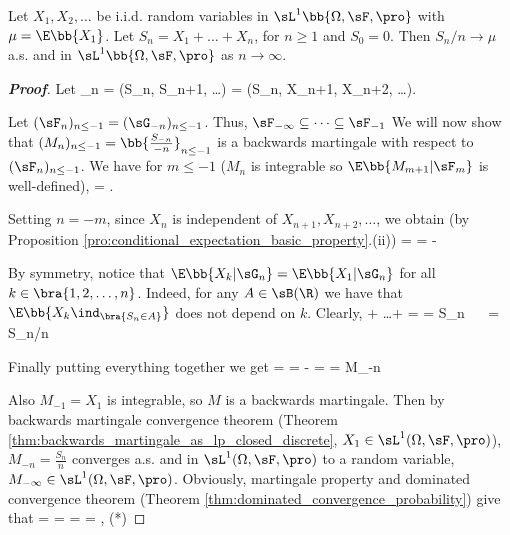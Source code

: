 \begin{theorem}\label{thm:slln_martingale}
Let $X_1, X_2, \dots$ be i.i.d. random variables in $\sL^1\bb{\Omega,\sF,\pro}$ with $\mu = \E\bb{X_1}$. Let $S_n = X_1 + \dots + X_n$, for $n\geq 1$ and $S_0 = 0$. Then $S_n/n \to \mu$ a.s. and in $\sL^1\bb{\Omega,\sF,\pro}$ as $n\to \infty$.
\end{theorem}

\begin{proof}[\bf Proof]%
Let
\be
\sG_n = \sigma(S_n, S_{n+1}, \dots) = \sigma(S_n, X_{n+1}, X_{n+2}, \dots ).
\ee

Let $(\sF_n)_{n\leq -1} = (\sG_{-n})_{n\leq -1}$. Thus, $\sF_{-\infty} \subseteq \dots \subseteq \sF_{-1}$ We will now show that $(M_n)_{n\leq -1} = \bb{\frac{S_{-n}}{-n}}_{n \leq -1}$ is a backwards martingale with respect to $(\sF_n)_{n\leq -1}$. We have for $m \leq -1$ ($M_n$ is integrable so $\E\bb{M_{m+1}|\sF_m}$ is well-defined),
\be
\E{} = \E {}.
\ee

Setting $n=-m$, since $X_n$ is independent of $X_{n+1},X_{n+2},\dots$, we obtain (by Proposition \ref{pro:conditional_expectation_basic_property}.(ii))
\be
\E{} = \E{} =  - \E{} 
\ee

By symmetry, notice that $\E\bb{X_k|\sG_n} = \E\bb{X_1|\sG_n}$ for all $k\in \bra{1,2,\dots,n}$. Indeed, for any $A\in \sB(\R)$ we have that $\E\bb{X_k\ind_{\bra{S_n\in A}}}$ does not depend on $k$. Clearly,
\be
\E{} + \dots + \E{} = \E{} = S_n  \ \ra \ \E{} = S_n/n 
\ee


Finally putting everything together we get
\be
\E{} =  \E{} =  -  =  = M_{-n} 
\ee

Also $M_{-1} = X_1$ is integrable, so $M$ is a backwards martingale. Then by backwards martingale convergence theorem (Theorem \ref{thm:backwards_martingale_as_lp_closed_discrete}, $X_1\in \sL^1(\Omega,\sF,\pro)$), $M_{-n} = \frac{S_n}{n}$ converges a.s. and in $\sL^1(\Omega,\sF,\pro)$ to a random variable, $M_{-\infty}\in \sL^1(\Omega,\sF,\pro)$. Obviously, martingale property and dominated convergence theorem (Theorem \ref{thm:dominated_convergence_probability}) give that %
\be
\mu = \E{} = \E{} = \E{} = \E {} \to \E{}, \quad (*)
\ee





\end{proof}
